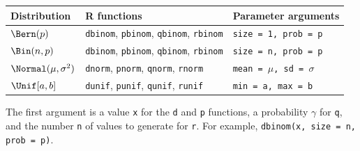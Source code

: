 \begin{center}
\begin{tabular}{@{}lll@{}}
\toprule
Distribution & R functions & Parameter arguments \\
\midrule
$\Bern(p)$ & \texttt{dbinom}, \texttt{pbinom}, \texttt{qbinom}, \texttt{rbinom} & \texttt{size = 1, prob = p} \\
$\Bin(n, p)$ & \texttt{dbinom}, \texttt{pbinom}, \texttt{qbinom}, \texttt{rbinom} & \texttt{size = n, prob = p} \\
$\Normal(\mu, \sigma^2)$ & \texttt{dnorm}, \texttt{pnorm}, \texttt{qnorm}, \texttt{rnorm} & \texttt{mean = $\mu$, sd = $\sigma$} \\
$\Unif[a, b]$ & \texttt{dunif}, \texttt{punif}, \texttt{qunif}, \texttt{runif} & \texttt{min = a, max = b} \\
\bottomrule
\end{tabular}
\end{center}
The first argument is a value \texttt{x} for the \texttt{d} and \texttt{p} functions, a probability $\gamma$ for \texttt{q}, and the number \texttt{n} of values to generate for \texttt{r}. For example, \texttt{dbinom(x, size = n, prob = p)}.
